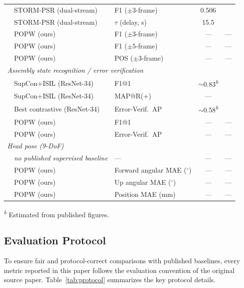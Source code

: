 \documentclass[11pt,a4paper]{article}
\newcommand{\popw}{POPW}
\newcommand{\todo}{\textit{---}}
\newcommand{\popwres}{\todo}
\newcommand{\sym}[1]{\textsuperscript{\textit{#1}}}
\begin{document}
\begin{table}[!htbp]
\begin{tabular}{l l l c c}
  & STORM-PSR (dual-stream) & F1 ($\pm3$-frame) & 0.506 & \cite{schoonbeek2025storm} \\
  & STORM-PSR (dual-stream) & ${\tau}$ (delay, s) & 15.5 & \cite{schoonbeek2025storm} \\
  & \popw{} (ours)            & F1 ($\pm3$-frame) & \popwres & --- \\
  & \popw{} (ours)            & F1 ($\pm5$-frame) & \popwres & --- \\
  & \popw{} (ours)            & POS ($\pm3$-frame) & \popwres & --- \\
\midrule
\multicolumn{5}{l}{\textit{Assembly state recognition / error verification}} \\
 & SupCon+ISIL (ResNet-34)   & F1@1           & \texttt{$\sim$}0.83\sym{b} & \cite{schoonbeek2024supcon} \\
 & SupCon+ISIL (ResNet-34)   & MAP@R(+)       & --- & \cite{schoonbeek2024supcon} \\
 & Best contrastive (ResNet-34) & Error-Verif.\ AP & \texttt{$\sim$}0.58\sym{b} & \cite{lehman2024statediffnet} \\
 & \popw{} (ours)            & F1@1           & \popwres & --- \\
 & \popw{} (ours)            & Error-Verif.\ AP & \popwres & --- \\
\midrule
\multicolumn{5}{l}{\textit{Head pose (9-DoF)}} \\
 & \textit{no published supervised baseline} & --- & --- & --- \\
 & \popw{} (ours)            & Forward angular MAE ($^\circ$)  & \popwres & --- \\
 & \popw{} (ours)            & Up angular MAE ($^\circ$)       & \popwres & --- \\
 & \popw{} (ours)            & Position MAE (mm)               & \popwres & --- \\
\bottomrule
\end{tabular}

\vspace{0.4em}
\footnotesize
\sym{b} Estimated from published figures.
\end{table}

\FloatBarrier

\subsection{Evaluation Protocol}
\label{sec:eval-protocol}

To ensure fair and protocol-correct comparisons with published baselines, every metric reported in this paper follows the evaluation convention of the original source paper. Table~\ref{tab:protocol} summarizes the key protocol details.
\end{document}
